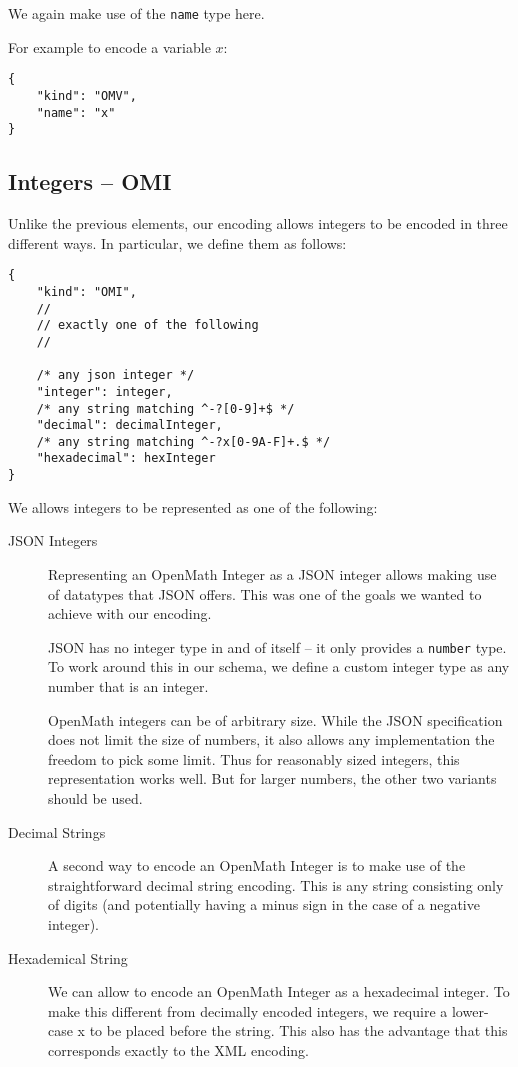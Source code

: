We again make use of the \texttt{name} type here. 

For example to encode a variable $x$:
\\\begin{minipage}{\linewidth}
\begin{lstlisting}
{
    "kind": "OMV",
    "name": "x"
}
\end{lstlisting}\end{minipage}

\subsection{Integers -- OMI}

Unlike the previous elements, our encoding allows integers to be encoded in three different ways. 
In particular, we define them as follows:
\\\begin{minipage}{\linewidth}
\begin{lstlisting}
{
    "kind": "OMI",
    //
    // exactly one of the following
    //

    /* any json integer */
    "integer": integer,
    /* any string matching ^-?[0-9]+$ */
    "decimal": decimalInteger,
    /* any string matching ^-?x[0-9A-F]+.$ */
    "hexadecimal": hexInteger
}
\end{lstlisting}\end{minipage}

We allows integers to be represented as one of the following:
\begin{description}
    \item[JSON Integers]
    Representing an OpenMath Integer as a JSON integer allows making use of datatypes that JSON offers. 
    This was one of the goals we wanted to achieve with our encoding. 
    
    JSON has no integer type in and of itself -- it only provides a \texttt{number} type. 
    To work around this in our schema, we define a custom integer type as any number that is an integer. 
        
    OpenMath integers can be of arbitrary size. 
    While the JSON specification does not limit the size of numbers, it also allows any implementation the freedom to pick some limit. 
    Thus for reasonably sized integers, this representation works well. 
    But for larger numbers, the other two variants should be used. 

    \item[Decimal Strings]
    A second way to encode an OpenMath Integer is to make use of the straightforward decimal string encoding. 
    This is any string consisting only of digits (and potentially having a minus sign in the case of a negative integer). 

    \item[Hexademical String]
    We can allow to encode an OpenMath Integer as a hexadecimal integer. 
    To make this different from decimally encoded integers, we require a lower-case x to be placed before the string. 
    This also has the advantage that this corresponds exactly to the XML encoding.     
\end{description}

